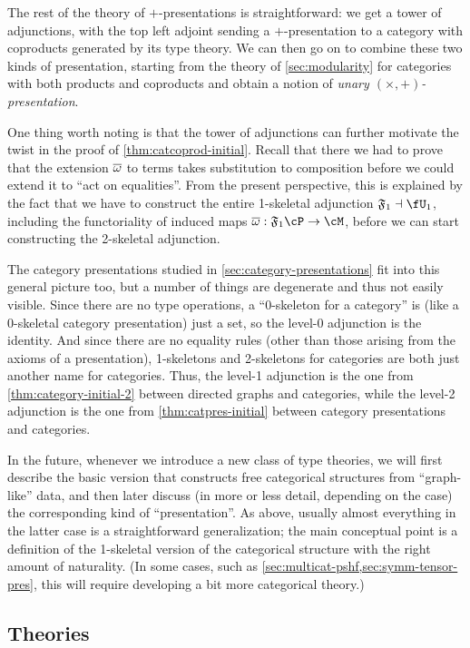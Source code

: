 The rest of the theory of $+$-presentations is straightforward: we get a tower of adjunctions, with the top left adjoint sending a $+$-presentation to a category with coproducts generated by its type theory.
We can then go on to combine these two kinds of presentation, starting from the theory of \cref{sec:modularity} for categories with both products and coproducts and obtain a notion of \emph{unary $(\times,+)$-presentation}.

One thing worth noting is that the tower of adjunctions can further motivate the twist in the proof of \cref{thm:catcoprod-initial}.
Recall that there we had to prove that the extension $\overline{\omega}$ to terms takes substitution to composition before we could extend it to ``act on equalities''.
From the present perspective, this is explained by the fact that we have to construct the entire 1-skeletal adjunction $\F1 \adj \fU_1$, including the functoriality of induced maps $\free:\F1\cP \to \cM$, before we can start constructing the 2-skeletal adjunction.

The category presentations studied in \cref{sec:category-presentations} fit into this general picture too, but a number of things are degenerate and thus not easily visible.
Since there are no type operations, a ``0-skeleton for a category'' is (like a 0-skeletal category presentation) just a set, so the level-0 adjunction is the identity.
And since there are no equality rules (other than those arising from the axioms of a presentation), 1-skeletons and 2-skeletons for categories are both just another name for categories.
Thus, the level-1 adjunction is the one from \cref{thm:category-initial-2} between directed graphs and categories, while the level-2 adjunction is the one from \cref{thm:catpres-initial} between category presentations and categories.

In the future, whenever we introduce a new class of type theories, we will first describe the basic version that constructs free categorical structures from ``graph-like'' data, and then later discuss (in more or less detail, depending on the case) the corresponding kind of ``presentation''.
As above, usually almost everything in the latter case is a straightforward generalization; the main conceptual point is a definition of the 1-skeletal version of the categorical structure with the right amount of naturality.
(In some cases, such as \cref{sec:multicat-pshf,sec:symm-tensor-pres}, this will require developing a bit more categorical theory.)


\subsection{Theories}
\label{sec:theories}

